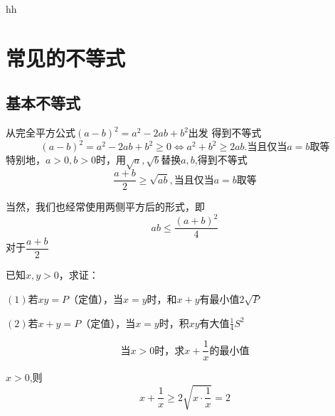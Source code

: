 \begin{proposition}
    hh
    
\end{proposition}












\clearpage
\section{常见的不等式}
\subsection{基本不等式}
从完全平方公式$(a-b)^2=a^2-2ab+b^2$出发
得到不等式
\[(a-b)^2=a^2-2ab+b^2 \geq 0 \Leftrightarrow a^2+b^2\geq 2ab.\text{当且仅当$a=b$取等} \]
特别地，$a>0,b>0$时，用$\sqrt{a},\sqrt{b}$替换$a,b$,得到不等式
\[\frac{a+b}{2}\geq \sqrt{ab},\text{当且仅当$a=b$取等}\]

当然，我们也经常使用两侧平方后的形式，即
\[ab\leq \frac{(a+b)^2}{4}\]
对于$\dfrac{a+b}{2}$
\begin{example}
    已知$x,y>0$，求证：

    $(1)$若$xy=P$（定值），当$x=y$时，和$x+y$有最小值$2\sqrt{P}$

    $(2)$若$x+y=P$（定值），当$x=y$时，积$xy$有大值$\frac{1}{4}S^2$
\end{example}
\begin{example}
   \[ \text{当$x>0$时，求}x+\frac{1}{x}\text{的最小值}\]
\end{example}
\begin{jie}
    $x>0$,则
\[x+\frac{1}{x} \geq 2\sqrt{x\cdot\frac{1}{x}}=2\]
\end{jie}

